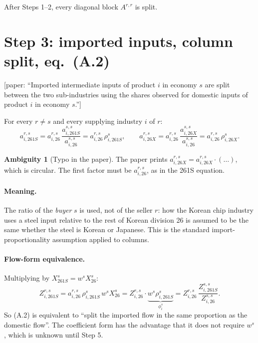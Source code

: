 \documentclass[11pt,a4paper]{article}
\theoremstyle{remark}
\theoremstyle{definition}
\newtheorem{issue}{Ambiguity}
\newcommand{\sem}{{261S}}   %
\newcommand{\oth}{{26X}}    %
\newcommand{\agg}{{26}}     %
\newcommand{\paper}[1]{\textcolor{blue!50!black}{[paper: #1]}}
\begin{document}
After Steps 1--2, every diagonal block $A^{r,r}$ is split.

\section{Step 3: imported inputs, column split, eq.~(A.2)}

\paper{``Imported intermediate inputs of product $i$ in economy $s$ are split between the two sub-industries using
the shares observed for domestic inputs of product $i$ in economy $s$.''}

For every $r\neq s$ and every supplying industry $i$ of $r$:
\begin{equation}
  a^{r,s}_{i,\sem} = a^{r,s}_{i,\agg}\,\frac{a^{s,s}_{i,\sem}}{a^{s,s}_{i,\agg}} = a^{r,s}_{i,\agg}\,\rho^s_{i,\sem},
  \qquad
  a^{r,s}_{i,\oth} = a^{r,s}_{i,\agg}\,\frac{a^{s,s}_{i,\oth}}{a^{s,s}_{i,\agg}} = a^{r,s}_{i,\agg}\,\rho^s_{i,\oth}.
  \tag{A.2}
\end{equation}

\begin{issue}[Typo in the paper]
The paper prints $a^{r,s}_{i,\oth} = a^{r,s}_{i,\oth}\cdot(\dots)$, which is circular. The first factor must be
$a^{r,s}_{i,\agg}$, as in the \sem{} equation.
\end{issue}

\paragraph{Meaning.} The ratio of the \emph{buyer} $s$ is used, not of the seller $r$: how the Korean chip industry
uses a steel input relative to the rest of Korean division 26 is assumed to be the same whether the steel is
Korean or Japanese. This is the standard import-proportionality assumption applied to columns.

\paragraph{Flow-form equivalence.} Multiplying by $X^s_\sem = w^s X^s_\agg$:
\[
  Z^{r,s}_{i,\sem} = a^{r,s}_{i,\agg}\,\rho^s_{i,\sem}\,w^s X^s_\agg
   = Z^{r,s}_{i,\agg}\cdot \underbrace{w^s\rho^s_{i,\sem}}_{\phi^s_i}
   = Z^{r,s}_{i,\agg}\,\frac{Z^{s,s}_{i,\sem}}{Z^{s,s}_{i,\agg}}.
\]
So (A.2) is equivalent to ``split the imported flow in the same proportion as the domestic flow''. The coefficient
form has the advantage that it does not require $w^s$, which is unknown until Step 5.
\end{document}
